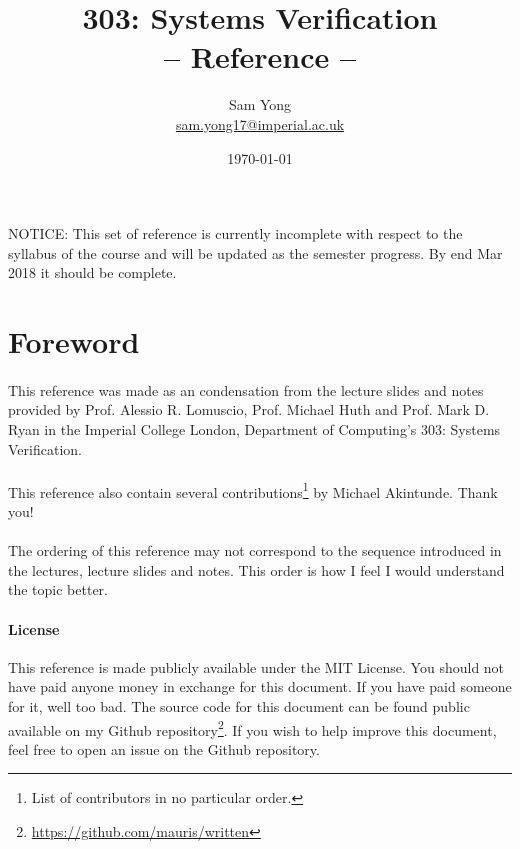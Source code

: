 \documentclass{article}
\title{
	 \huge 303: Systems Verification\\
	 \huge -- Reference --
}
\date{\today}
\author{
	Sam Yong \\
	\small \href{mailto:sam.yong17@imperial.ac.uk}{sam.yong17@imperial.ac.uk}
}
\theoremstyle{plain}
\theoremstyle{definition}
\begin{document}
\maketitle

\begin{multicols}{2}

\paragraph{} NOTICE: This set of reference is currently incomplete with respect to the syllabus of the course and will be updated as the semester progress. By end Mar 2018 it should be complete.

\section*{Foreword}  

\paragraph{} This reference was made as an condensation from the lecture slides and notes provided by Prof. Alessio R. Lomuscio, Prof. Michael Huth and Prof. Mark D. Ryan in the Imperial College London, Department of Computing's 303: Systems Verification.

\paragraph{} This reference also contain several contributions\footnote{List of contributors in no particular order.} by Michael Akintunde. Thank you!

\paragraph{} The ordering of this reference may not correspond to the sequence introduced in the lectures, lecture slides and notes. This order is how I feel I would understand the topic better.

\begin{footnotesize}
\paragraph{License} This reference is made publicly available under the MIT License. You should not have paid anyone money in exchange for this document. If you have paid someone for it, well too bad. The source code for this document can be found public available on my Github repository\footnote{\href{https://github.com/mauris/written}{https://github.com/mauris/written}}. If you wish to help improve this document, feel free to open an issue on the Github repository.
\end{footnotesize}


\end{multicols}
\end{document}
